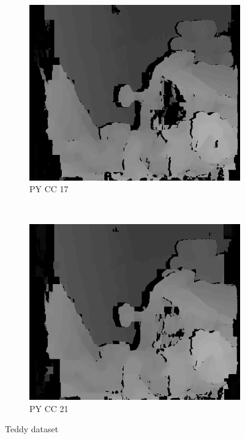 \begin{figure}
\begin{subfigure}[b]{0.23\textwidth}
    \centering
    \includegraphics[width=\textwidth]{images/stereo-pairs/teddy_pyramid_crosschecked_17.png}
    \caption{PY CC 17}
  \end{subfigure}
  ~
  \begin{subfigure}[b]{0.23\textwidth}
    \centering
    \includegraphics[width=\textwidth]{images/stereo-pairs/teddy_pyramid_crosschecked_21.png}
    \caption{PY CC 21}
  \end{subfigure}

  \caption{Teddy dataset}

\end{figure}


